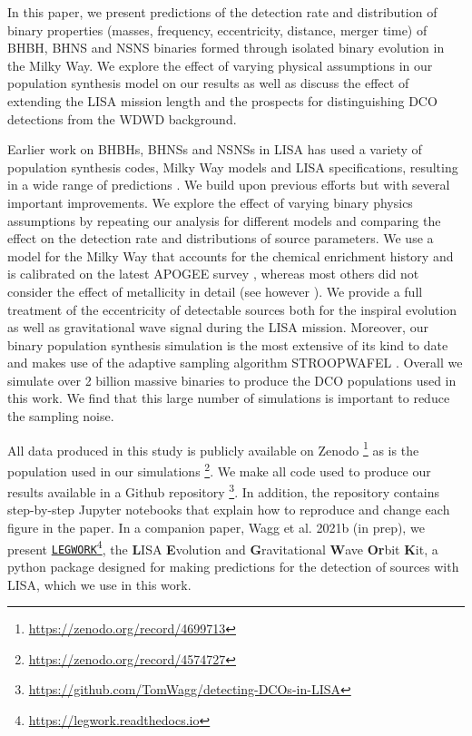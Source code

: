 In this paper, we present predictions of the detection rate and distribution of binary properties (masses, frequency, eccentricity, distance, merger time) of BHBH, BHNS and NSNS binaries formed through isolated binary evolution in the Milky Way. We explore the effect of varying physical assumptions in our population synthesis model on our results as well as discuss the effect of extending the LISA mission length and the prospects for distinguishing DCO detections from the WDWD background.

Earlier work on BHBHs, BHNSs and NSNSs in LISA has used a variety of population synthesis codes, Milky Way models and LISA specifications, resulting in a wide range of predictions \citep{Nelemans+2001,Liu+2009,Belczynski+2010,Liu+2014,Lamberts+2019,Lau+2020,Breivik+2020,Sesana+2020}. We build upon previous efforts but with several important improvements. We explore the effect of varying binary physics assumptions by repeating our analysis for \nModels{} different models and comparing the effect on the detection rate and distributions of source parameters. We use a model for the Milky Way that accounts for the chemical enrichment history and is calibrated on the latest APOGEE survey \citep{Majewski+2017,Frankel+2018}, whereas most others did not consider the effect of metallicity in detail (see however \citealp{Lamberts+2019, Sesana+2020}). We provide a full treatment of the eccentricity of detectable sources both for the inspiral evolution as well as gravitational wave signal during the LISA mission. Moreover, our binary population synthesis simulation is the most extensive of its kind to date and makes use of the adaptive sampling algorithm STROOPWAFEL \citep{Broekgaarden+2019, Broekgaarden+2021}. Overall we simulate over 2 billion massive binaries to produce the DCO populations used in this work. We find that this large number of simulations is important to reduce the sampling noise.

All data produced in this study is publicly available on Zenodo \href{https://zenodo.org/record/4699713}{\faFileCode}\footnote{\url{https://zenodo.org/record/4699713}} as is the population used in our simulations \href{https://zenodo.org/record/4574727}{\faFileCode}\footnote{\url{https://zenodo.org/record/4574727}}. We make all code used to produce our results available in a Github repository \href{https://github.com/TomWagg/detecting-DCOs-in-LISA}{\faGithub}\footnote{\url{https://github.com/TomWagg/detecting-DCOs-in-LISA}}. In addition, the repository contains step-by-step Jupyter notebooks that explain how to reproduce and change each figure in the paper. In a companion paper, Wagg et al. 2021b (in prep), we present \href{https://legwork.readthedocs.io}{\texttt{LEGWORK}}\footnote{\url{https://legwork.readthedocs.io}}, the \textbf{L}ISA \textbf{E}volution and \textbf{G}ravitational \textbf{W}ave \textbf{Or}bit \textbf{K}it, a python package designed for making predictions for the detection of sources with LISA, which we use in this work.

